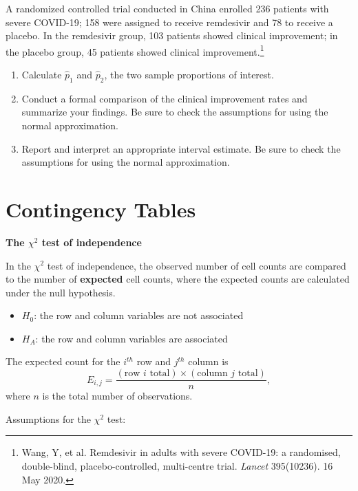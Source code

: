 \documentclass[letterpaper,12pt,twoside,]{pinp}
\begin{document}
\begin{enumerate}
  A randomized controlled trial conducted in China enrolled 236 patients
  with severe COVID-19; 158 were assigned to receive remdesivir and 78
  to receive a placebo. In the remdesivir group, 103 patients showed
  clinical improvement; in the placebo group, 45 patients showed
  clinical
  improvement.\footnote{Wang, Y, et al. Remdesivir in adults with severe COVID-19: a randomised, double-blind, placebo-controlled, multi-centre trial. \textit{Lancet} 395(10236). 16 May 2020.}

  \begin{enumerate}
  \def\labelenumii{\alph{enumii})}
  \item
    Calculate \(\hat{p}_1\) and \(\hat{p}_2\), the two sample
    proportions of interest.
  \item
    Conduct a formal comparison of the clinical improvement rates and
    summarize your findings. Be sure to check the assumptions for using
    the normal approximation.
  \item
    Report and interpret an appropriate interval estimate. Be sure to
    check the assumptions for using the normal approximation.
  \end{enumerate}
\end{enumerate}

\newpage

\hypertarget{contingency-tables}{%
\section{Contingency Tables}\label{contingency-tables}}

\textbf{The \(\chi^2\) test of independence}

In the \(\chi^2\) test of independence, the observed number of cell
counts are compared to the number of \textbf{expected} cell counts,
where the expected counts are calculated under the null hypothesis.

\begin{itemize}
\item
  \(H_0\): the row and column variables are not associated
\item
  \(H_A\): the row and column variables are associated
\end{itemize}

The expected count for the \(i^{th}\) row and \(j^{th}\) column is
\[E_{i, j} = \dfrac{(\text{row $i$ total}) \times (\text{column $j$ total}) }{n}, \]
where \(n\) is the total number of observations.

Assumptions for the \(\chi^2\) test:
\end{document}
